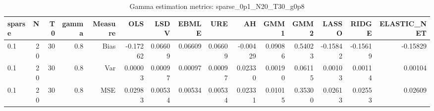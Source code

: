 \begin{table}[!htbp]\centering
\caption{Gamma estimation metrics: sparse_0p1_N20_T30_g0p8}
\label{tab:table1_sparse_0p1_N20_T30_g0p8}
\begin{tabular}{lrrrrrrrrrrrrrr}
\hline
sparse & N & T0 & gamma & Measure & OLS & LSDV & EBMLE & URE & AH & GMM1 & GMM2 & LASSO & RIDGE & ELASTIC_NET \\
\hline
0.1 & 20 & 30 & 0.8 & Bias & -0.17262 & 0.06609 & 0.06609 & 0.06609 & -0.00429 & 0.09086 & 0.54023 & -0.15842 & -0.15619 & -0.15829 \\
0.1 & 20 & 30 & 0.8 & Var & 0.00003 & 0.00097 & 0.00097 & 0.00097 & 0.02330 & 0.00190 & 0.06115 & 0.00103 & 0.00114 & 0.00104 \\
0.1 & 20 & 30 & 0.8 & MSE & 0.02983 & 0.00534 & 0.00534 & 0.00534 & 0.02331 & 0.01015 & 0.35300 & 0.02613 & 0.02553 & 0.02609 \\
\hline
\end{tabular}
\end{table}

